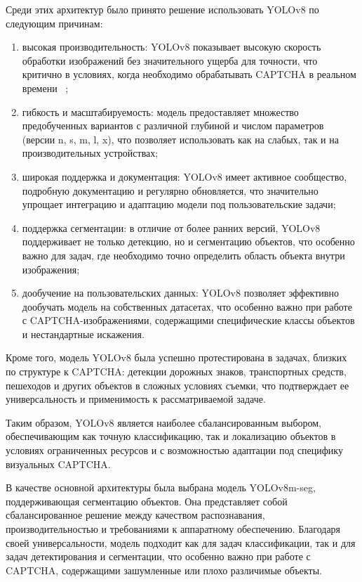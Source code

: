 Среди этих архитектур было принято решение использовать YOLOv8 по следующим 
причинам:
\begin{enumerate}
    \item высокая производительность: YOLOv8 показывает высокую скорость 
    обработки изображений без значительного ущерба для точности, что критично в 
    условиях, когда необходимо обрабатывать CAPTCHA в реальном времени~
    \cite{bochkovskiy2020yolov4};
    \item гибкость и масштабируемость: модель предоставляет множество 
    предобученных вариантов с различной глубиной и числом параметров (версии n, 
    s, m, l, x), что позволяет использовать как на слабых, так и на 
    производительных устройствах;
    \item широкая поддержка и документация: YOLOv8 имеет активное сообщество, 
    подробную документацию и регулярно обновляется, что значительно упрощает 
    интеграцию и адаптацию модели под пользовательские задачи;
    \item поддержка сегментации: в отличие от более ранних версий, YOLOv8 
    поддерживает не только детекцию, но и сегментацию объектов, что особенно 
    важно для задач, где необходимо точно определить область объекта внутри 
    изображения;
    \item дообучение на пользовательских данных: YOLOv8 позволяет эффективно 
    дообучать модель на собственных датасетах, что особенно важно при работе с 
    CAPTCHA-изображениями, содержащими специфические классы объектов и 
    нестандартные искажения.
\end{enumerate}

Кроме того, модель YOLOv8 была успешно протестирована в задачах, близких по 
структуре к CAPTCHA: детекции дорожных знаков, транспортных средств, пешеходов и 
других объектов в сложных условиях съемки, что подтверждает ее универсальность и 
применимость к рассматриваемой задаче.

Таким образом, YOLOv8 является наиболее сбалансированным выбором, обеспечивающим 
как точную классификацию, так и локализацию объектов в условиях ограниченных 
ресурсов и с возможностью адаптации под специфику визуальных CAPTCHA.

В качестве основной архитектуры была выбрана модель YOLOv8m-seg, поддерживающая 
сегментацию объектов. Она представляет собой сбалансированное решение между 
качеством распознавания, производительностью и требованиями к аппаратному 
обеспечению. Благодаря своей универсальности, модель подходит как для задач 
классификации, так и для задач детектирования и сегментации, что особенно важно 
при работе с CAPTCHA, содержащими зашумленные или плохо различимые объекты.

